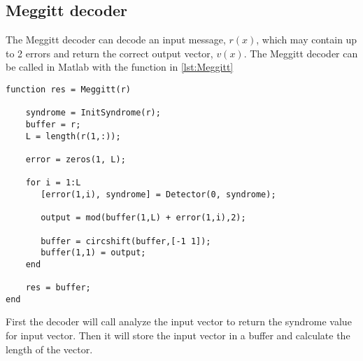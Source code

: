 \documentclass[Main]{subfiles}
\begin{document}
\subsection{Meggitt decoder}

The Meggitt decoder can decode an input message, $r(x)$, which may contain up to 2 errors and return the correct output vector, $v(x)$.
The Meggitt decoder can be called in Matlab with the function in \codeTitle \ref{lst:Meggitt}

\begin{lstlisting}[caption=Meggit decoder function, style=Code-Matlab, label=lst:Meggitt]
function res = Meggitt(r)

	syndrome = InitSyndrome(r);
	buffer = r;
	L = length(r(1,:));
	
	error = zeros(1, L);
	
	for i = 1:L
	   [error(1,i), syndrome] = Detector(0, syndrome); 
	
	   output = mod(buffer(1,L) + error(1,i),2);
	
	   buffer = circshift(buffer,[-1 1]);
	   buffer(1,1) = output;   
	end
	
	res = buffer;
end
\end{lstlisting}
First the decoder will call analyze the input vector to return the syndrome value for input vector.
Then it will store the input vector in a buffer and calculate the length of the vector.
\end{document}
